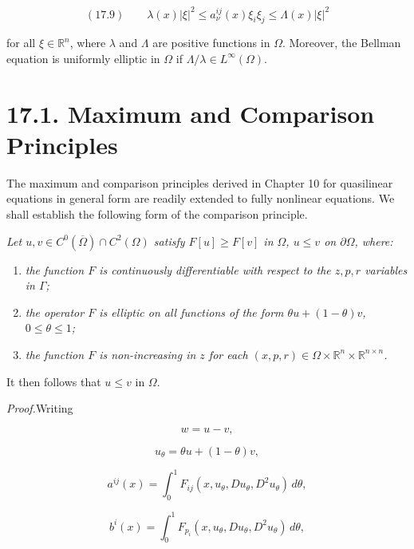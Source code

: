 \[
(17.9)\qquad \lambda(x)|\xi|^2 \le a_\nu^{ij}(x)\xi_i\xi_j \le \Lambda(x)|\xi|^2
\]

for all $\xi \in \mathbb R^n$, where $\lambda$ and $\Lambda$ are positive functions in $\Omega$. Moreover, the Bellman
equation is uniformly elliptic in $\Omega$ if $\Lambda/\lambda \in L^\infty(\Omega)$.

\bigskip

\section*{17.1. Maximum and Comparison Principles}

The maximum and comparison principles derived in Chapter 10 for quasilinear
equations in general form are readily extended to fully nonlinear equations. We
shall establish the following form of the comparison principle.

\begin{theorem}[Theorem 17.1]\label{gt-ch17-thm-17-1}
\emph{Let $u, v \in C^0(\overline{\Omega}) \cap C^2(\Omega)$ satisfy $F[u] \geq F[v]$ in $\Omega$, $u \leq v$ on $\partial \Omega$,
where:}

\begin{enumerate}
\item[(i)] \emph{the function $F$ is continuously differentiable with respect to the $z, p, r$ variables
in $\Gamma$;}
\item[(ii)] \emph{the operator $F$ is elliptic on all functions of the form $\theta u + (1 - \theta)v$,
$0 \leq \theta \leq 1$;}
\item[(iii)] \emph{the function $F$ is non-increasing in $z$ for each $(x, p, r) \in \Omega \times \mathbb R^n \times \mathbb R^{n \times n}$.}
\end{enumerate}

It then follows that $u \leq v$ in $\Omega$.
\end{theorem}


\textit{Proof.}\quad Writing

\[
w=u-v,
\]

\[
u_{\theta}=\theta u+(1-\theta)v,
\]

\[
a^{ij}(x)=\int_{0}^{1}F_{ij}(x,u_{\theta},Du_{\theta},D^{2}u_{\theta})\,d\theta,
\]

\[
b^{i}(x)=\int_{0}^{1}F_{p_{i}}(x,u_{\theta},Du_{\theta},D^{2}u_{\theta})\,d\theta,
\]

